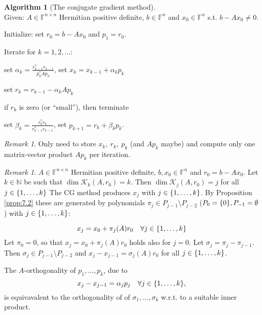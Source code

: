 \documentclass[12pt]{article}
\newcounter{lecture}
\theoremstyle{definition}
\newtheorem{algorithm}[theorem]{Algorithm}
\theoremstyle{remark}
\newtheorem{remark}[theorem]{Remark}
\newtheorem*{remark*}{Remark}
\numberwithin{equation}{section}
\newcommand{\F}{\mathbb{F}}
\newcommand{\N}{\mathbb{N}}
\newcommand{\K}{\mathcal{K}}
\DeclarePairedDelimiter{\set}{\{}{\}}
\begin{document}
\begin{algorithm}[The conjugate gradient method]~\\[\parskip]
  \label{alg:7.8}
  Given: $A \in \F^{n\times n}$ Hermitian positive definite, $b \in \F^n$ and $x_0 \in \F^n$ s.t. $b-Ax_0 \neq 0$.

  Initialize: set $r_0 = b - Ax_0$ and $p_1 = r_0$.

  Iterate for $k = 1,2, \ldots$\::

  \hspace{2em} set $\alpha_k = \frac{r_{k-1}^* r_{k-1}}{p_k^* A p_k}$, set $x_k = x_{k-1} + \alpha_k p_k$

  \hspace{2em} set $r_k = r_{k-1} - \alpha_k A p_k$

  \hspace{2em} if $r_k$ is zero (or ``small''), then terminate

  \hspace{2em} set $\beta_k = \frac{r_k^* r_k}{r_{k-1}^* r_{k-1}}$, set $p_{k+1} = r_k + \beta_k p_k$.
\end{algorithm}
\begin{remark*}
  Only need to store $x_k,\ r_k,\ p_k$ (and $A p_k$ maybe) and compute  only one matrix-vector product $A p_k$ per iteration.
\end{remark*}

\begin{remark}
  \label{rem:8.1}
  $A \in \F^{n\times n}$ Hermitian positive definite, $b,x_0 \in \F^n$ and $r_0 = b - Ax_0$. Let $k \in \N$ be such that $\dim \K_k(A,r_0) = k$. Then $\dim \K_j(A,r_0) = j$ for all $j \in \set{1,\ldots,k}$ The CG method produces $x_j$ with $j \in \set{1,\ldots,k}$. By Proposition \ref{prop:7.2} these are generated by polynomials $\pi_j \in P_{j-1} \setminus P_{j-2}$ ($P_0 = \set{0}, P_{-1}=\emptyset$) with $j \in \set{1,\ldots,k}$:

  \begin{equation*}
    x_j = x_0 + \pi_j(A) r_0 \quad \forall j \in \set{1,\ldots,k}
  \end{equation*}
  Let $\pi_0 = 0$, so that $x_j = x_0 + \pi_j(A) r_0$ holds also for $j=0$. Let $\sigma_j = \pi_j - \pi_{j-1}$. Then $\sigma_j \in P_{j-1} \setminus P_{j-2}$ and $x_j - x_{j-1} = \sigma_j(A) r_0$ for all $j \in \set{1,\ldots,k}$.
\end{remark}

The $A$-orthogonality of $p_1, \ldots, p_k$, due to
\begin{equation*}
  x_j - x_{j-1} = \alpha_j p_j\quad \forall j \in \set{1,\ldots,k},
\end{equation*}
is equivavalent to the orthogonality of of $\sigma_1, \ldots, \sigma_k$ w.r.t. to a suitable inner product.
\end{document}
